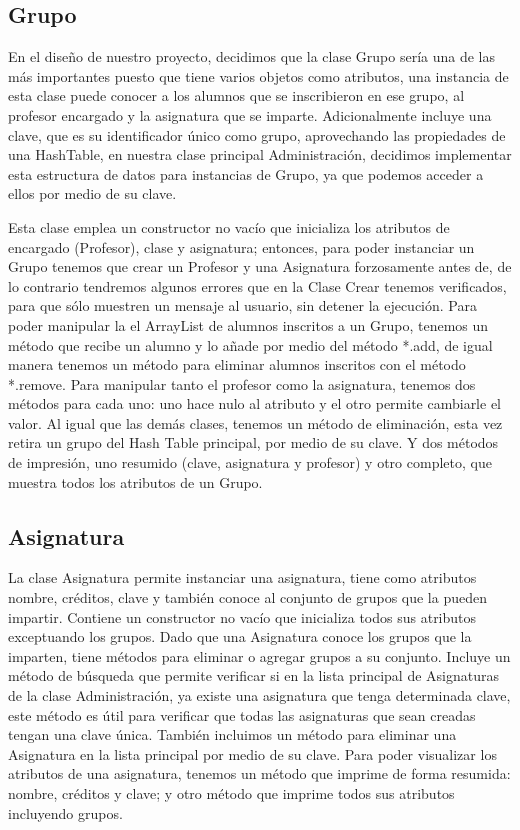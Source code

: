 \documentclass[11pt]{article}
\begin{document}
\subsection{Grupo}
\par

En el diseño de nuestro proyecto, decidimos que la clase Grupo sería una de las más importantes puesto que tiene varios objetos como atributos, una instancia de esta clase puede conocer a los alumnos que se inscribieron en ese grupo, al profesor encargado y la asignatura que se imparte. Adicionalmente incluye una clave, que es su identificador único como grupo, aprovechando las propiedades de una HashTable, en nuestra clase principal Administración, decidimos implementar esta estructura de datos para instancias de Grupo, ya que podemos acceder a ellos por medio de su clave.
\par
Esta clase emplea un constructor no vacío que inicializa los atributos de encargado (Profesor), clase y asignatura; entonces, para poder instanciar un Grupo tenemos que crear un Profesor y una Asignatura forzosamente antes de, de lo contrario tendremos algunos errores que en la Clase Crear tenemos verificados, para que sólo muestren un mensaje al usuario, sin detener la ejecución.  Para poder manipular la el ArrayList de alumnos inscritos a un Grupo, tenemos un método que recibe un alumno y lo añade por medio del método *.add, de igual manera tenemos un método para eliminar alumnos inscritos con el método *.remove. Para manipular tanto el profesor como la asignatura, tenemos dos métodos para cada uno: uno hace nulo al atributo y el otro permite cambiarle el valor. Al igual que las demás clases, tenemos un método de eliminación, esta vez retira un grupo del Hash Table principal, por medio de su clave. Y dos métodos de impresión, uno resumido (clave, asignatura y profesor) y otro completo, que muestra todos los atributos de un Grupo.

\subsection{Asignatura}
\par

La clase Asignatura permite instanciar una asignatura, tiene como atributos nombre, créditos, clave y también conoce al conjunto de grupos que la pueden impartir. Contiene un constructor no vacío que inicializa todos sus atributos exceptuando los grupos. Dado que una Asignatura conoce los grupos que la imparten, tiene métodos para eliminar o agregar grupos a su conjunto. Incluye un método de búsqueda que permite verificar si en la lista principal de Asignaturas de la clase Administración, ya existe una asignatura que tenga determinada clave, este método es útil para verificar que todas las asignaturas que sean creadas tengan una clave única. También incluimos un método para eliminar una Asignatura en la lista principal por medio de su clave. Para poder visualizar los atributos de una asignatura, tenemos un método que imprime de forma resumida: nombre, créditos y clave; y otro método que imprime todos sus atributos incluyendo grupos.
\end{document}
